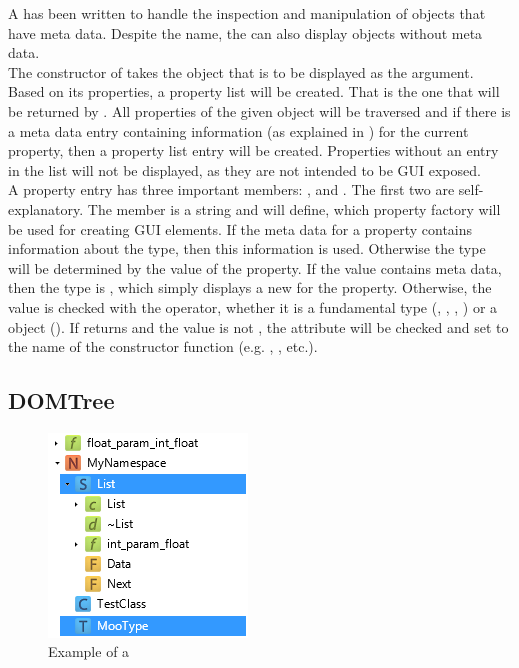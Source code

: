 A  has been written to handle the inspection and manipulation of  objects that have meta data. Despite the name, the  can also display objects without meta data.\\
The constructor of  takes the object that is to be displayed as the argument. Based on its properties, a property list will be created. That is the one that will be returned by . All properties of the given object will be traversed and if there is a meta data entry containing  information (as explained in ) for the current property, then a property list entry will be created. Properties without an entry in the list will not be displayed, as they are not intended to be GUI exposed.\\
A property entry has three important members: ,  and . The first two are self-explanatory. The  member is a string and will define, which property factory will be used for creating GUI elements. If the meta data for a property contains information about the type, then this information is used. Otherwise the type will be determined by the value of the property. If the value contains meta data, then the type is , which simply displays a new  for the property. Otherwise, the value is checked with the   operator, whether it is a fundamental type (, , , ) or a  object (). If  returns  and the value is not , the  attribute will be checked and  set to the name of the constructor function (e.g. , , etc.).


\subsection{DOMTree}

\begin{figure}
  \begin{center}
    \includegraphics[scale=0.75]{Images/DOMTree.png}
  \end{center}
  \caption{Example of a }
  \label{fig:DOMTree}
   \vspace{-15pt}
\end{figure}


